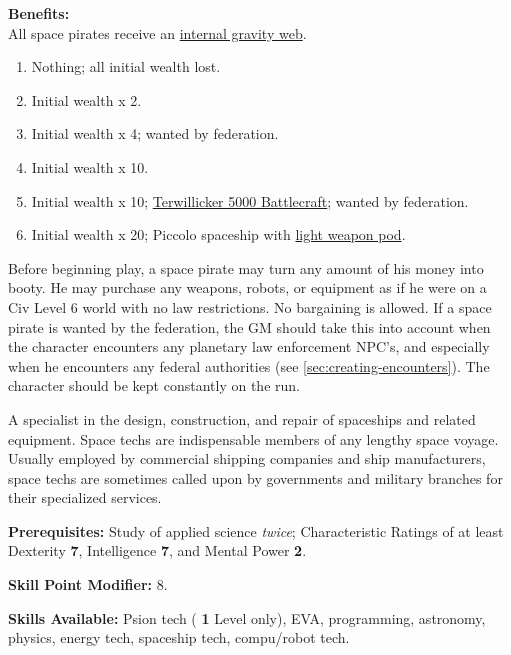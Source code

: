 \pagebreak[2]
\textbf{Benefits:}\\
All space pirates receive an \hyperlink{tag:gravity-web}{internal gravity web}.   
\begin{enumerate}
\item Nothing; all initial wealth lost.  
\item Initial wealth x 2.   
\item Initial wealth x 4; wanted by federation.
\item Initial wealth x 10.   
\item Initial wealth x 10; \hyperlink{tag:terwillicker-5000}{Terwillicker 5000 Battlecraft}; wanted by
  federation.
\item Initial wealth x 20; \hypertarget{tag:harmonics-piccolo}{Piccolo spaceship} with \hyperlink{tag:pod-light-weapon}{light weapon pod}.
\end{enumerate}

Before beginning play, a space pirate may turn any amount of his money
into booty. He may purchase any weapons, robots, or equipment as if he
were on a Civ Level 6 world with no law restrictions. No bargaining is
allowed. If a space pirate is wanted by the federation, the GM should
take this into account when the character encounters any planetary law
enforcement NPC's, and especially when he encounters any federal
authorities (see \ref{sec:creating-encounters}). The character should
be kept constantly on the run.

\bigskip

\pagebreak[2]

\label{sec:prof-space-technician}

A specialist in the design, construction, and repair of spaceships and
related equipment. Space techs are
indispensable members of any lengthy space voyage. Usually  employed
by commercial shipping companies and  ship manufacturers, space techs
are sometimes called upon by governments and military branches for
their specialized  services.

\textbf{Prerequisites:} Study of applied science  \emph{twice};
Characteristic  Ratings of at least  Dexterity  \textbf{7}, Intelligence  \textbf{7},
and Mental Power \textbf{2}.   

\textbf{Skill Point Modifier:} 8.

\textbf{Skills Available:}  Psion tech ( \textbf{1} Level only), EVA,
   programming, astronomy, physics, energy tech, spaceship tech,
   compu/robot tech.

